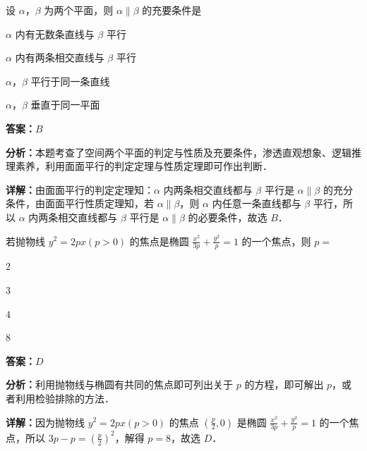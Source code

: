\begin{question}[points=5]
设 $\alpha$，$\beta$ 为两个平面，则 $\alpha\parallel\beta$ 的充要条件是
\begin{choices}
  \item $\alpha$ 内有无数条直线与 $\beta$ 平行
  \item $\alpha$ 内有两条相交直线与 $\beta$ 平行
  \item $\alpha$，$\beta$ 平行于同一条直线
  \item $\alpha$，$\beta$ 垂直于同一平面
\end{choices}
\begin{solution}
\textbf{答案：}$B$

\textbf{分析：}本题考查了空间两个平面的判定与性质及充要条件，渗透直观想象、逻辑推理素养，利用面面平行的判定定理与性质定理即可作出判断．

\textbf{详解：}由面面平行的判定定理知：$\alpha$ 内两条相交直线都与 $\beta$ 平行是 $\alpha\parallel\beta$ 的充分条件，由面面平行性质定理知，若 $\alpha\parallel\beta$，则 $\alpha$ 内任意一条直线都与 $\beta$ 平行，所以 $\alpha$ 内两条相交直线都与 $\beta$ 平行是 $\alpha\parallel\beta$ 的必要条件，故选 $B$．
\end{solution}
\end{question}

\begin{question}[points=5]
若抛物线 $y^2=2px(p>0)$ 的焦点是椭圆 $\frac{x^2}{3p}+\frac{y^2}{p}=1$ 的一个焦点，则 $p=$
\begin{choices}
  \item $2$
  \item $3$
  \item $4$
  \item $8$
\end{choices}
\begin{solution}
\textbf{答案：}$D$

\textbf{分析：}利用抛物线与椭圆有共同的焦点即可列出关于 $p$ 的方程，即可解出 $p$，或者利用检验排除的方法．

\textbf{详解：}因为抛物线 $y^2=2px(p>0)$ 的焦点 $(\frac{p}{2},0)$ 是椭圆 $\frac{x^2}{3p}+\frac{y^2}{p}=1$ 的一个焦点，所以 $3p-p=(\frac{p}{2})^2$，解得 $p=8$，故选 $D$．
\end{solution}
\end{question}


